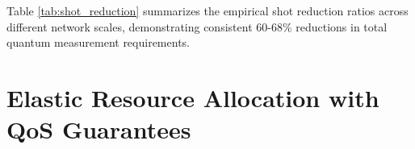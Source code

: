 \documentclass[lettersize,journal]{IEEEtran}
\begin{document}
Table \ref{tab:shot_reduction} summarizes the empirical shot reduction ratios across different network scales, demonstrating consistent 60-68\% reductions in total quantum measurement requirements.










\section{Elastic Resource Allocation with QoS Guarantees}
\label{sec:elastic_qos}

\end{document}
